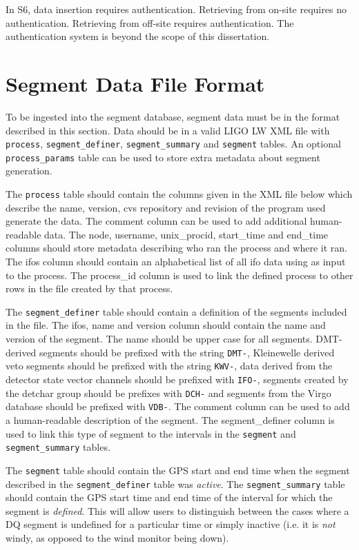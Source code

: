 In S6, data insertion requires authentication. Retrieving from on-site
requires no authentication. Retrieving from off-site requires
authentication.  The authentication system is beyond the scope of this
dissertation.

\section{Segment Data File Format}

To be ingested into the segment database, segment data must be in the
format described in this section. Data should be in a valid LIGO LW
XML file with \verb|process|, \verb|segment_definer|,
\verb|segment_summary| and \verb|segment| tables. An optional
\verb|process_params| table can be used to store extra metadata about
segment generation.

The \verb|process| table should contain the columns given in the XML
file below which describe the name, version, cvs repository and
revision of the program used generate the data. The comment column can
be used to add additional human-readable data. The node, username,
unix\_procid, start\_time and end\_time columns should store metadata
describing who ran the process and where it ran. The ifos column
should contain an alphabetical list of all ifo data using as input to
the process. The process\_id column is used to link the defined
process to other rows in the file created by that process.

The \verb|segment_definer| table should contain a definition of the
segments included in the file. The ifos, name and version column
should contain the name and version of the segment. The name should be
upper case for all segments. DMT-derived segments should be prefixed
with the string \verb|DMT-|, Kleinewelle derived veto segments should
be prefixed with the string \verb|KWV-|, data derived from the
detector state vector channels should be prefixed with \verb|IFO-|,
segments created by the detchar group should be prefixes with
\verb|DCH-| and segments from the Virgo database should be prefixed
with \verb|VDB-|.  The comment column can be used to add a
human-readable description of the segment. The segment\_definer column
is used to link this type of segment to the intervals in the
\verb|segment| and \verb|segment_summary| tables.

The \verb|segment| table should contain the GPS start and end time
when the segment described in the \verb|segment_definer| table was
\emph{active}. The \verb|segment_summary| table should contain the GPS
start time and end time of the interval for which the segment is
\emph{defined}. This will allow users to distinguish between the cases
where a DQ segment is undefined for a particular time or simply
inactive (i.e. it is \emph{not} windy, as opposed to the wind monitor
being down).

